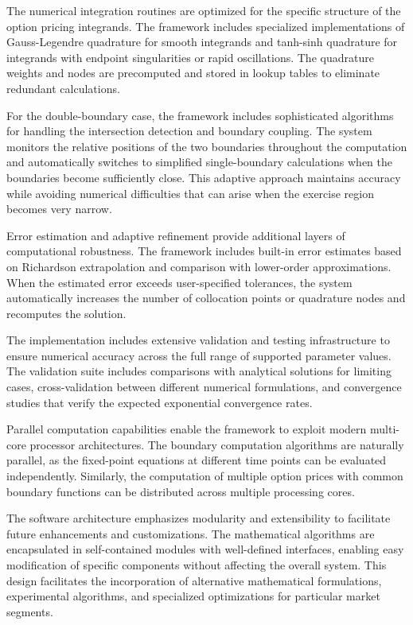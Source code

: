 \documentclass[
  american,
  11pt,
  11pt,
  letterpaper,
  onecolumn]{article}
\begin{document}
The numerical integration routines are optimized for the specific
structure of the option pricing integrands. The framework includes
specialized implementations of Gauss-Legendre quadrature for smooth
integrands and tanh-sinh quadrature for integrands with endpoint
singularities or rapid oscillations. The quadrature weights and nodes
are precomputed and stored in lookup tables to eliminate redundant
calculations.

For the double-boundary case, the framework includes sophisticated
algorithms for handling the intersection detection and boundary
coupling. The system monitors the relative positions of the two
boundaries throughout the computation and automatically switches to
simplified single-boundary calculations when the boundaries become
sufficiently close. This adaptive approach maintains accuracy while
avoiding numerical difficulties that can arise when the exercise region
becomes very narrow.

Error estimation and adaptive refinement provide additional layers of
computational robustness. The framework includes built-in error
estimates based on Richardson extrapolation and comparison with
lower-order approximations. When the estimated error exceeds
user-specified tolerances, the system automatically increases the number
of collocation points or quadrature nodes and recomputes the solution.

The implementation includes extensive validation and testing
infrastructure to ensure numerical accuracy across the full range of
supported parameter values. The validation suite includes comparisons
with analytical solutions for limiting cases, cross-validation between
different numerical formulations, and convergence studies that verify
the expected exponential convergence rates.

Parallel computation capabilities enable the framework to exploit modern
multi-core processor architectures. The boundary computation algorithms
are naturally parallel, as the fixed-point equations at different time
points can be evaluated independently. Similarly, the computation of
multiple option prices with common boundary functions can be distributed
across multiple processing cores.

The software architecture emphasizes modularity and extensibility to
facilitate future enhancements and customizations. The mathematical
algorithms are encapsulated in self-contained modules with well-defined
interfaces, enabling easy modification of specific components without
affecting the overall system. This design facilitates the incorporation
of alternative mathematical formulations, experimental algorithms, and
specialized optimizations for particular market segments.
\end{document}

